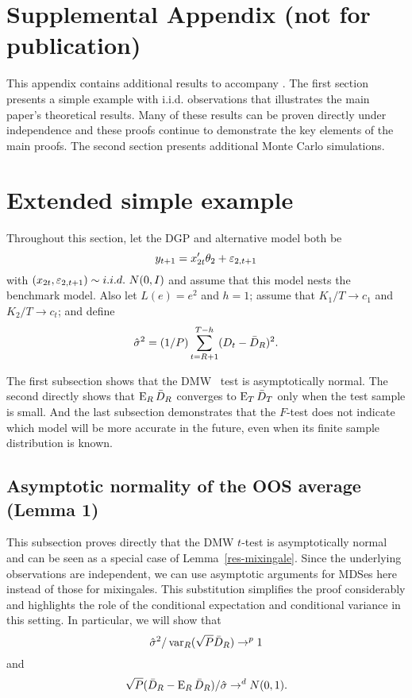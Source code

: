 \section*{Supplemental Appendix (not for publication)}

\noindent%
This appendix contains additional results to accompany
\citet{Cal:15b}. The first section presents a simple example with
i.i.d. observations that illustrates the main paper's theoretical
results. Many of these results can be proven directly under
independence and these proofs continue to demonstrate the key elements
of the main proofs. The second section presents additional Monte Carlo
simulations.

\section{Extended simple example}
\label{sec:example}

Throughout this section, let the DGP and alternative model both be
\[
  y_{t+1} = x_{2t}'\theta_2 + \varepsilon_{2,t+1}
\]
with $(x_{2t}, \varepsilon_{2,t+1}) \sim i.i.d.\ N(0,I)$ and assume that this
model nests the benchmark model. Also let $L(e) = e^2$
and $h = 1$; assume that $K_1/T \to c_1$ and $K_2/T \to c_t$; and
define
\[
  \hat{\sigma}^2 = (1/P) \sum_{t=R+1}^{T-h} (D_t - \bar{D}_{R})^2.
\]

The first
subsection shows that the DMW \oost\ test is asymptotically normal. The
second directly shows that $\operatorname{E}_R \bar{D}_{R}$ converges to
$\operatorname{E}_T \bar{D}_{T}$ only when the test sample is small. And the last
subsection demonstrates that the $F$-test does not indicate which
model will be more accurate in the future, even when its finite sample
distribution is known.

\subsection{Asymptotic normality of the OOS average (Lemma 1)}

This subsection proves directly that the DMW $t$-test is
asymptotically normal and can be seen as a special case of
Lemma~\ref{res-mixingale}. Since the underlying observations are
independent, we can use asymptotic arguments for MDSes here instead of
those for mixingales.  This substitution simplifies the proof
considerably and highlights the role of the conditional expectation
and conditional variance in this setting.  In particular, we will show
that
\begin{equation}
  \hat{\sigma}^2 / \operatorname{var}_R(\sqrt{P} \bar{D}_{R}) \to^p 1
\end{equation}
and
\begin{equation}
  \sqrt{P} (\bar{D}_{R} - \operatorname{E}_R \bar{D}_{R}) / \hat{\sigma} \to^d N(0,1).
\end{equation}

